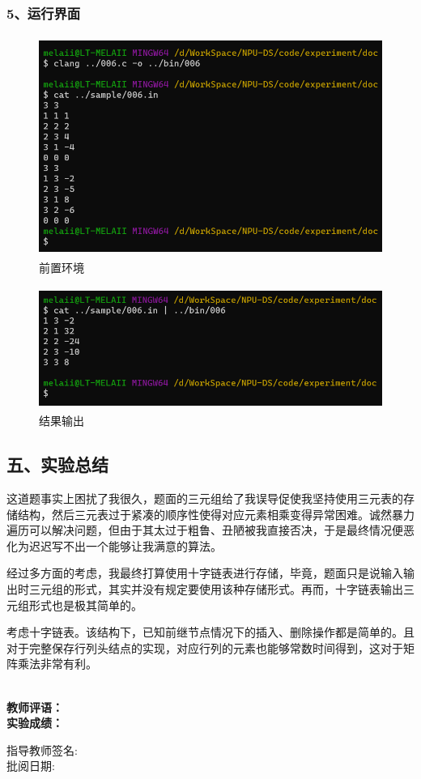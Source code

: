 \documentclass[UTF8, a4paper]{ctexart}
\begin{document}
\subsubsection*{5、运行界面}
\begin{figure}[H]
	\begin{minipage}[t]{\linewidth}
		\centering
		\includegraphics[width=125mm,height=72mm]{./assets/DS06-2}
		\caption{前置环境}
	\end{minipage}
\end{figure}
\begin{figure}[H]
	\begin{minipage}[t]{\linewidth}
		\centering
		\includegraphics[width=125mm,height=40mm]{./assets/DS06-3}
		\caption{结果输出}
	\end{minipage}
\end{figure}

\subsection*{五、实验总结}
这道题事实上困扰了我很久，题面的三元组给了我误导促使我坚持使用三元表的存储结构，然后三元表过于紧凑的顺序性使得对应元素相乘变得异常困难。诚然暴力遍历可以解决问题，但由于其太过于粗鲁、丑陋被我直接否决，于是最终情况便恶化为迟迟写不出一个能够让我满意的算法。 \par
经过多方面的考虑，我最终打算使用十字链表进行存储，毕竟，题面只是说输入输出时三元组的形式，其实并没有规定要使用该种存储形式。再而，十字链表输出三元组形式也是极其简单的。 \par
考虑十字链表。该结构下，已知前继节点情况下的插入、删除操作都是简单的。且对于完整保存行列头结点的实现，对应行列的元素也能够常数时间得到，这对于矩阵乘法非常有利。 \par

~\\
\textbf{教师评语：}
~\\
\textbf{实验成绩：}

\begin{flushright}
\mbox{指导教师签名:\qquad\qquad} \\
\mbox{批阅日期:\qquad\qquad}
\end{flushright}
\end{document}
